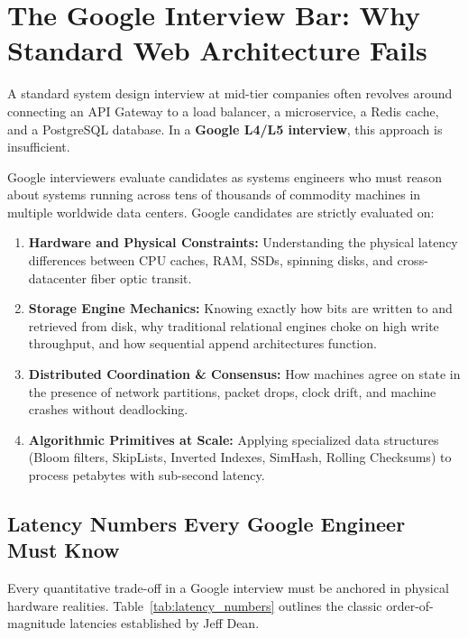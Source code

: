 \documentclass[10pt,journal,compsoc,onecolumn]{IEEEtran}
\begin{document}
\maketitle
\IEEEdisplaynontitleabstractindextext
\IEEEpeerreviewmaketitle

\section{The Google Interview Bar: Why Standard Web Architecture Fails}
\label{sec:google_bar}

A standard system design interview at mid-tier companies often revolves around connecting an API Gateway to a load balancer, a microservice, a Redis cache, and a PostgreSQL database. In a \textbf{Google L4/L5 interview}, this approach is insufficient.

Google interviewers evaluate candidates as systems engineers who must reason about systems running across tens of thousands of commodity machines in multiple worldwide data centers. Google candidates are strictly evaluated on:
\begin{enumerate}
    \item \textbf{Hardware and Physical Constraints:} Understanding the physical latency differences between CPU caches, RAM, SSDs, spinning disks, and cross-datacenter fiber optic transit.
    \item \textbf{Storage Engine Mechanics:} Knowing exactly how bits are written to and retrieved from disk, why traditional relational engines choke on high write throughput, and how sequential append architectures function.
    \item \textbf{Distributed Coordination \& Consensus:} How machines agree on state in the presence of network partitions, packet drops, clock drift, and machine crashes without deadlocking.
    \item \textbf{Algorithmic Primitives at Scale:} Applying specialized data structures (Bloom filters, SkipLists, Inverted Indexes, SimHash, Rolling Checksums) to process petabytes with sub-second latency.
\end{enumerate}

\subsection{Latency Numbers Every Google Engineer Must Know}
Every quantitative trade-off in a Google interview must be anchored in physical hardware realities. Table~\ref{tab:latency_numbers} outlines the classic order-of-magnitude latencies established by Jeff Dean.
\end{document}
